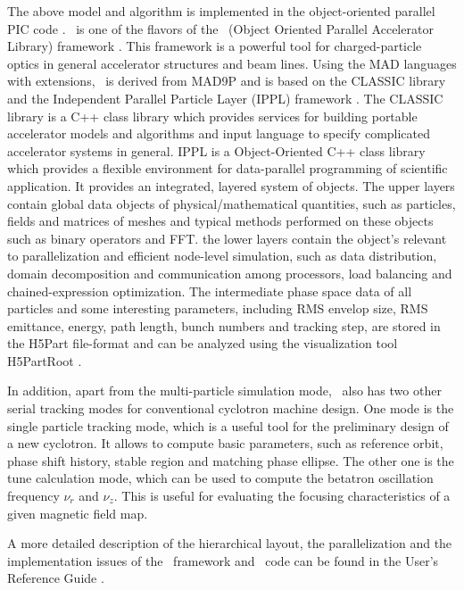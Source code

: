 \documentclass{JAC2003}
\begin{document}
The above model and algorithm is implemented in the object-oriented parallel PIC code \opalcycl. 
\opalcycl \  is one of the flavors of the \opal \ (Object Oriented Parallel Accelerator Library) framework \cite{opal:1}. This framework is a powerful tool for charged-particle optics in general accelerator structures and beam lines.
Using the MAD languages with extensions,
\opal \  is derived from MAD9P \cite{Ada:1} and is based on the CLASSIC \cite{Classic:1} library and the Independent Parallel Particle Layer (IPPL) framework \cite{Ippl:1}. 
The CLASSIC library is a C++ class library which provides services for building portable accelerator models and algorithms and input 
language to specify complicated accelerator systems in general. IPPL is a Object-Oriented C++ class library which provides a flexible
environment for data-parallel programming of scientific application. It provides an integrated, layered system of objects. The upper layers
contain global data objects of physical/mathematical quantities, such as particles, fields and matrices of meshes and typical methods
performed on these objects such as binary operators and FFT. the lower layers contain the object's relevant to parallelization and efficient node-level
simulation, such as data distribution, domain decomposition and communication among processors, load balancing and chained-expression optimization. 
The intermediate phase space data of all particles and some interesting parameters, 
including RMS envelop size, RMS emittance, energy, path length, bunch numbers and 
tracking step, are stored in the H5Part \cite{H5part:1} file-format and can be analyzed
using the visualization tool H5PartRoot \cite{Thomas:1}.

In addition, apart from the multi-particle simulation mode, \opalcycl \  also has two other serial tracking modes for conventional cyclotron machine design. 
One mode is the single particle tracking mode, which is a useful tool for 
the preliminary design of a new cyclotron. It allows to compute  basic parameters, such as reference orbit, phase shift history,
stable region and matching phase ellipse. The other one is the tune calculation mode, which can be used to compute the betatron oscillation frequency 
$\nu_r$ and $\nu_z$. This is useful for evaluating 
the focusing characteristics of a given magnetic field map. 

A more detailed description of the hierarchical layout, the parallelization and the implementation issues of the \opal \  framework and \opalcycl \  code
can be found in the User's Reference Guide \cite{opal:1}.  
\end{document}
